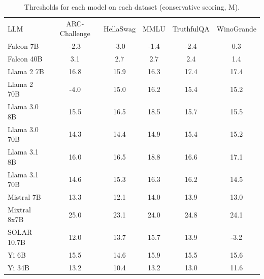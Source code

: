 \begin{table}[h]
\caption{Thresholds for each model on each dataset (conservative scoring, M). }
\label{tab:thresholds_logit_max_k20_w2}
\centering
\begin{tabular}{l S[table-format=3.1] S[table-format=3.1] S[table-format=3.1] S[table-format=3.1] S[table-format=3.1]}
\toprule
LLM & ARC-Challenge & HellaSwag & MMLU & TruthfulQA & WinoGrande \\ 
\cmidrule(lr){1-1} \cmidrule(lr){2-2} \cmidrule(lr){3-3} \cmidrule(lr){4-4} \cmidrule(lr){5-5} \cmidrule(lr){6-6}
Falcon 7B & -2.3 & -3.0 & -1.4 & -2.4 & 0.3\\
Falcon 40B & 3.1 & 2.7 & 2.7 & 2.4 & 1.4\\
Llama 2 7B & 16.8 & 15.9 & 16.3 & 17.4 & 17.4\\
Llama 2 70B & -4.0 & 15.0 & 16.2 & 15.4 & 15.2\\
Llama 3.0 8B & 15.5 & 16.5 & 18.5 & 15.7 & 15.5\\
Llama 3.0 70B & 14.3 & 14.4 & 14.9 & 15.4 & 15.2\\
Llama 3.1 8B & 16.0 & 16.5 & 18.8 & 16.6 & 17.1\\
Llama 3.1 70B & 14.6 & 15.3 & 16.3 & 16.2 & 14.5\\
Mistral 7B & 13.3 & 12.1 & 14.0 & 13.9 & 13.0\\
Mixtral 8x7B & 25.0 & 23.1 & 24.0 & 24.8 & 24.1\\
SOLAR 10.7B & 12.0 & 13.7 & 15.7 & 13.9 & -3.2\\
Yi 6B & 15.5 & 14.6 & 15.9 & 15.5 & 15.6\\
Yi 34B & 13.2 & 10.4 & 13.2 & 13.0 & 11.6\\
\bottomrule
\end{tabular}
\end{table}
